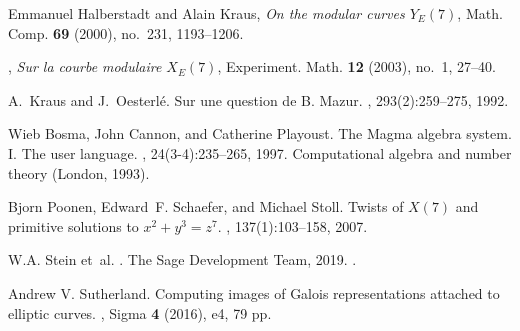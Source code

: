 \documentclass[12pt]{amsart}
\numberwithin{equation}{section}
\theoremstyle{definition}
\theoremstyle{remark}
\begin{document}
\begin{thebibliography}{999}
Emmanuel Halberstadt and Alain Kraus, \emph{On the modular curves {$Y_E(7)$}},
  Math. Comp. \textbf{69} (2000), no.~231, 1193--1206. 

\bysame, \emph{Sur la courbe modulaire {$X_E(7)$}}, Experiment. Math.
  \textbf{12} (2003), no.~1, 27--40. 
  
A.~Kraus and J.~Oesterl\'{e}.
\newblock Sur une question de {B}. {M}azur.
, 293(2):259--275, 1992.

Wieb Bosma, John Cannon, and Catherine Playoust.
\newblock The {M}agma algebra system. {I}. {T}he user language.
, 24(3-4):235--265, 1997.
\newblock Computational algebra and number theory (London, 1993).

Bjorn Poonen, Edward~F. Schaefer, and Michael Stoll.
\newblock Twists of {$X(7)$} and primitive solutions to {$x^2+y^3=z^7$}.
, 137(1):103--158, 2007.

W.\thinspace{}A. Stein et~al.
.
\newblock The Sage Development Team, 2019.
.

Andrew V. Sutherland.
\newblock Computing images of Galois representations attached to elliptic curves.
, Sigma {\bf 4} (2016), e4, 79 pp.

    
\begin{comment}
 
\bibitem{AnniSiksek} S.\ Anni and S.\ Siksek,
{\em Modular elliptic curves over real abelian fields and the generalized {F}ermat equation $x^{2\ell} + y^{2m}=z^p$}, Algebra \& Number Theory {\bf 10} (2016), no.6, 1147--1172


\bibitem{BennetSkinner} M.\ A.\ Bennett and C.\ M.\ Skinner,
{\em Ternary Diophantine equations via Galois representations and modular forms}, Canad.\ J.\ Math.\ {\bf 56} (2004), no. 1, 23--54.
 


\end{comment}
\end{thebibliography}
\end{document}
